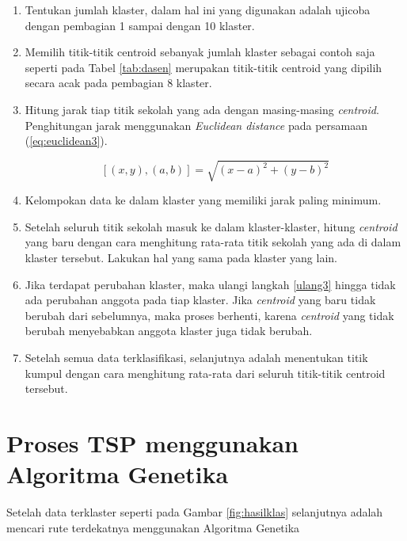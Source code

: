 \begin{enumerate}
	\item Tentukan jumlah klaster, dalam hal ini yang digunakan adalah ujicoba dengan pembagian 1 sampai dengan 10 klaster.
	\item Memilih titik-titik centroid sebanyak jumlah klaster sebagai contoh saja seperti pada Tabel \ref{tab:dasen} merupakan titik-titik centroid yang dipilih secara acak pada pembagian 8 klaster.
	


	\item \label{ulang3} Hitung jarak tiap titik sekolah yang ada dengan masing-masing \textit{centroid}. Penghitungan jarak menggunakan \textit{Euclidean distance} pada persamaan (\ref{eq:euclidean3}).
	
	\begin{equation}
	\left[ \left( x,y \right) ,\left( a,b \right)\right]=\sqrt{\left( x-a \right)^{2}+\left( y-b \right)^{2}}
	\label{eq:euclidean3}
	\end{equation}	
	
	\item Kelompokan data ke dalam klaster yang memiliki jarak paling minimum.
	\item Setelah seluruh titik sekolah masuk ke dalam klaster-klaster, hitung \textit{centroid} yang baru dengan cara menghitung rata-rata titik sekolah yang ada di dalam klaster tersebut. Lakukan hal yang sama pada klaster yang lain.
	\item Jika terdapat perubahan klaster, maka ulangi langkah \ref{ulang3} hingga tidak ada perubahan anggota pada tiap klaster. Jika \textit{centroid} yang baru tidak berubah dari sebelumnya, maka proses berhenti, karena \textit{centroid} yang tidak berubah menyebabkan anggota klaster juga tidak berubah.
	
	\item Setelah semua data terklasifikasi, selanjutnya adalah menentukan titik kumpul dengan cara menghitung rata-rata dari seluruh titik-titik centroid tersebut.
\end{enumerate}

\section{Proses TSP menggunakan Algoritma Genetika}

Setelah data terklaster seperti pada Gambar \ref{fig:hasilklas} selanjutnya adalah mencari rute terdekatnya menggunakan Algoritma Genetika

